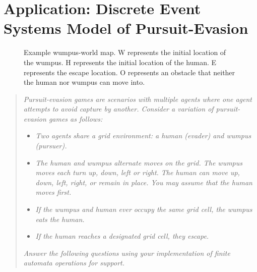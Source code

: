 \documentclass[12pt,letterpaper]{ntdhw}
\begin{document}
\clearpage
\section*{Application: Discrete Event Systems Model of Pursuit-Evasion}

\begin{figure}[b]
  \centering
  \caption{Example wumpus-world map.  W represents the initial
    location of the wumpus.  H represents the initial location of the
    human.  E represents the escape location.  O represents an
    obstacle that neither the human nor wumpus can move into.}
  \label{fig:map}
\end{figure}

\begin{quote}

\emph{\emph{Pursuit-evasion games} are scenarios with multiple agents
  where one agent attempts to avoid capture by another.  Consider a
  variation of pursuit-evasion games as follows:}

\begin{itemize}
  \item \it Two agents share a grid environment: a human (evader) and wumpus
  (pursuer).
  \item \it The human and wumpus alternate moves on the grid.  The
  wumpus moves each turn up, down, left or right.  The human can move
  up, down, left, right, or remain in place.  You may assume that the
  human moves first.
  \item \it If the wumpus and human ever occupy the same grid cell,
  the wumpus eats the human.
  \item \it If the human reaches a designated grid cell, they escape.
\end{itemize}

\emph{Answer the following questions using your implementation of finite
automata operations for support.}

\end{quote}
\end{document}
